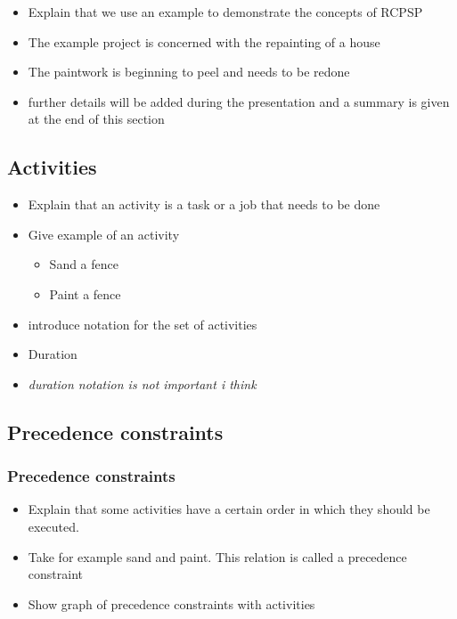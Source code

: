 \documentclass{beamer}
\theoremstyle{definition}
\newcommand{\mick}[1]{{\color{red}\emph{#1}}}
\begin{document}
\begin{frame}
	\begin{itemize}
		\item Explain that we use an example to demonstrate the concepts of RCPSP
		\item The example project is concerned with the repainting of a house
		\item The paintwork is beginning to peel and needs to be redone
		\item further details will be added during the presentation and a summary is given at the end of this section
	\end{itemize}
\end{frame}

\subsection{Activities}
\begin{frame}
	\begin{itemize}
		\item Explain that an activity is a task or a job that needs to be done
		\item Give example of an activity
		\begin{itemize}
			\item Sand a fence
			\item Paint a fence
		\end{itemize}
		\item introduce notation for the set of activities
		\item Duration
		\item \mick{duration notation is not important i think}
	\end{itemize}
\end{frame}

\subsection{Precedence constraints}
\begin{frame}
	\frametitle{Precedence constraints}
	\begin{itemize}
		\item Explain that some activities have a certain order in which they should be executed. 
		\item Take for example sand and paint. This relation is called a precedence constraint
		\item Show graph of precedence constraints with activities
	\end{itemize}
\end{frame}
\end{document}
